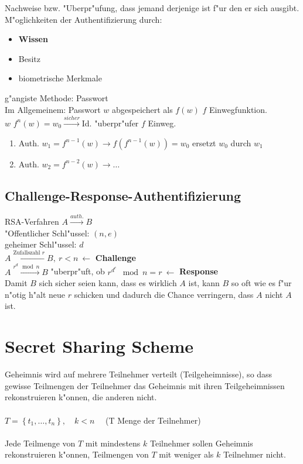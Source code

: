 Nachweise bzw. "Uberpr"ufung, dass jemand derjenige ist f"ur den er sich ausgibt.\\
M"oglichkeiten der Authentifizierung durch:
\begin{itemize}
	\item[] \textbf{Wissen}
	\item[] Besitz
	\item[] biometrische Merkmale
\end{itemize}
g"angiste Methode: Passwort \\
Im Allgemeinem: Passwort $w$ abgespeichert als $f(w)$ $f$ Einwegfunktion.\\
$w$ $f^n(w)=w_0 \xrightarrow{sicher}$Id. "uberpr"ufer $f$ Einweg.
\begin{enumerate}
	\item Auth. $w_1=f^{n-1}(w) \rightarrow f(f^{n-1}(w))=w_0$ ersetzt $w_0$ durch $w_1$
	\item Auth. $w_2=f^{n-2}(w) \rightarrow \ldots$
\end{enumerate}


\subsection{Challenge-Response-Authentifizierung}
RSA-Verfahren
$A \xrightarrow{auth.} B$\\
"Offentlicher Schl"ussel: $(n,e)$\\
geheimer Schl"ussel: $d$\\
$A \xleftarrow{\text{Zufallszahl }r} B,\ r<n\ \leftarrow$ \textbf{Challenge}\\
$A \xrightarrow{r^d \mod{n}} B$ "uberpr"uft, ob $r^{d^e} \mod{n} = r\ \leftarrow$ \textbf{Response}\\
Damit $B$ sich sicher seien kann, dass es wirklich $A$ ist, kann $B$ so oft wie es f"ur n"otig h"alt neue $r$ schicken und dadurch die Chance verringern, dass $A$ nicht $A$ ist.


\section{Secret Sharing Scheme}
Geheimnis wird auf mehrere Teilnehmer verteilt (Teilgeheimnisse), so dass gewisse Teilmengen der Teilnehmer das Geheimnis mit ihren Teilgeheimnissen rekonstruieren k"onnen, die anderen nicht. \\ \\
$T = \left\lbrace t_1, \ldots , t_n \right\rbrace,\quad k < n\quad$ (T Menge der Teilnehmer) \\ \\
Jede Teilmenge von $T$ mit mindestens $k$ Teilnehmer sollen Geheimnis rekonstruieren k"onnen, Teilmengen von $T$ mit weniger als $k$ Teilnehmer nicht.\\

